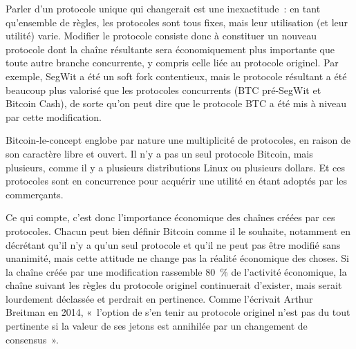 Parler d'un protocole unique qui changerait est une inexactitude~: en tant qu'ensemble de règles, les protocoles sont tous fixes, mais leur utilisation (et leur utilité) varie. Modifier le protocole consiste donc à constituer un nouveau protocole dont la chaîne résultante sera économiquement plus importante que toute autre branche concurrente, y compris celle liée au protocole originel. Par exemple, SegWit a été un soft fork contentieux, mais le protocole résultant a été beaucoup plus valorisé que les protocoles concurrents (BTC pré-SegWit et Bitcoin Cash), de sorte qu'on peut dire que le protocole BTC a été mis à niveau par cette modification. %

Bitcoin-le-concept englobe par nature une multiplicité de protocoles, en raison de son caractère libre et ouvert. Il n'y a pas un seul protocole Bitcoin, mais plusieurs, comme il y a plusieurs distributions Linux ou plusieurs dollars. Et ces protocoles sont en concurrence pour acquérir une utilité en étant adoptés par les commerçants.

Ce qui compte, c'est donc l'importance économique des chaînes créées par ces protocoles. Chacun peut bien définir Bitcoin comme il le souhaite, notamment en décrétant qu'il n'y a qu'un seul protocole et qu'il ne peut pas être modifié sans unanimité, mais cette attitude ne change pas la réalité économique des choses. Si la chaîne créée par une modification rassemble 80~\% de l'activité économique, la chaîne suivant les règles du protocole originel continuerait d'exister, mais serait lourdement déclassée et perdrait en pertinence. Comme l'écrivait Arthur Breitman en 2014, «~l'option de s'en tenir au protocole originel n'est pas du tout pertinente si la valeur de ses jetons est annihilée par un changement de consensus~». %

